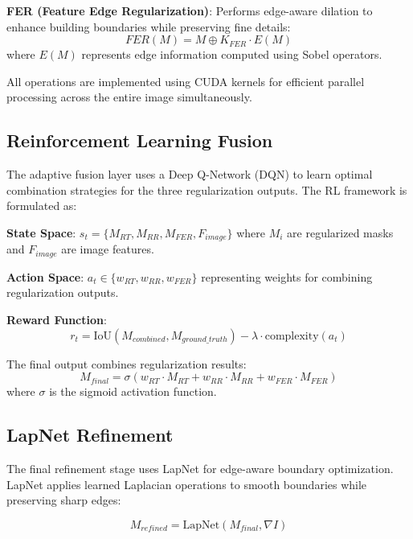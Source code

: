 \documentclass{article}
\begin{document}
\textbf{FER (Feature Edge Regularization)}: Performs edge-aware dilation to enhance building boundaries while preserving fine details:
\begin{equation}
FER(M) = M \oplus K_{FER} \cdot E(M)
\end{equation}
where $E(M)$ represents edge information computed using Sobel operators.

All operations are implemented using CUDA kernels for efficient parallel processing across the entire image simultaneously.

\subsection{Reinforcement Learning Fusion}

The adaptive fusion layer uses a Deep Q-Network (DQN) to learn optimal combination strategies for the three regularization outputs. The RL framework is formulated as:

\textbf{State Space}: $s_t = \{M_{RT}, M_{RR}, M_{FER}, F_{image}\}$ where $M_i$ are regularized masks and $F_{image}$ are image features.

\textbf{Action Space}: $a_t \in \{w_{RT}, w_{RR}, w_{FER}\}$ representing weights for combining regularization outputs.

\textbf{Reward Function}: 
\begin{equation}
r_t = \text{IoU}(M_{combined}, M_{ground\_truth}) - \lambda \cdot \text{complexity}(a_t)
\end{equation}

The final output combines regularization results:
\begin{equation}
M_{final} = \sigma(w_{RT} \cdot M_{RT} + w_{RR} \cdot M_{RR} + w_{FER} \cdot M_{FER})
\end{equation}
where $\sigma$ is the sigmoid activation function.

\subsection{LapNet Refinement}

The final refinement stage uses LapNet \cite{zeng2019learning} for edge-aware boundary optimization. LapNet applies learned Laplacian operations to smooth boundaries while preserving sharp edges:

\begin{equation}
M_{refined} = \text{LapNet}(M_{final}, \nabla I)
\end{equation}
\end{document}
